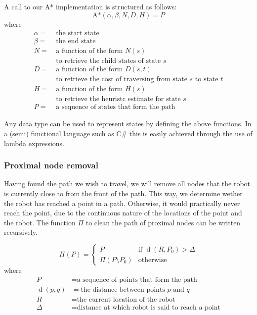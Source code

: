 \documentclass[10pt, abstracton, twocolumn]{scrartcl}
\DeclareMathOperator{\dist}{d}
\begin{document}
\begin{samepage}

A call to our A* implementation is structured as follows:
\nopagebreak
\[
\textrm{A*}(\alpha,\beta,N,D,H) = P
\]
\nopagebreak
where
\begin{align*}
\alpha =&\ \textrm{the start state} \\
\beta =&\ \textrm{the end state} \\
N =&\ \textrm{a function of the form $N(s)$} \\
&\ \textrm{to retrieve the child states of state $s$} \\
D =&\ \textrm{a function of the form $D(s,t)$} \\
&\ \textrm{to retrieve the cost of traversing from state $s$ to state $t$} \\
H =&\ \textrm{a function of the form $H(s)$} \\
&\ \textrm{to retrieve the heuristc estimate for state $s$} \\
P =&\ \textrm{a sequence of states that form the path}
\end{align*}

\end{samepage}

Any data type can be used to represent states by defining the above functions. In a (semi) functional language such as C\# this is easily achieved through the use of lambda expressions.

\subsubsection{Proximal node removal}
Having found the path we wish to travel, we will remove all nodes that the robot is currently close to from the front of the path. This way, we determine wether the robot has reached a point in a path. Otherwise, it would practically never reach the point, due to the continuous nature of the locations of the point and the robot. The function $\Pi$ to clean the path of proximal nodes can be written recursively.

\begin{samepage}

\[
\Pi(P) =
        \begin{cases}
        P & \textrm{if } \dist(R,P_0) > \Delta \\
        \Pi( P \setminus P_0 ) & \textrm{otherwise}
        \end{cases}
\]
\nopagebreak
where
\begin{align*}
P &= \textrm{a sequence of points that form the path} \\
\dist(p,q) &= \textrm{the distance between points $p$ and $q$} \\
R &= \textrm{the current location of the robot} \\
\Delta &= \textrm{distance at which robot is said to reach a point}
\end{align*}

\end{samepage}
\end{document}
